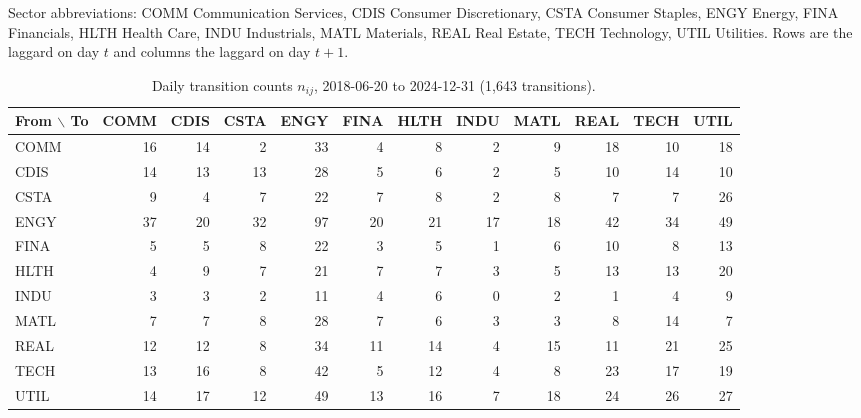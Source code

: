 \documentclass[11pt]{article}
\begin{document}
Sector abbreviations: COMM Communication Services, CDIS Consumer Discretionary, CSTA Consumer Staples, ENGY Energy, FINA Financials, HLTH Health Care, INDU Industrials, MATL Materials, REAL Real Estate, TECH Technology, UTIL Utilities. Rows are the laggard on day $t$ and columns the laggard on day $t+1$.

\begin{table}[htbp]\centering
\caption{Daily transition counts $n_{ij}$, 2018-06-20 to 2024-12-31 (1{,}643 transitions).}
\label{tab:counts}
\small
\setlength{\tabcolsep}{4pt}
\begin{tabular}{lrrrrrrrrrrr}
\toprule
From $\backslash$ To & COMM & CDIS & CSTA & ENGY & FINA & HLTH & INDU & MATL & REAL & TECH & UTIL \\
\midrule
COMM & 16 & 14 & 2 & 33 & 4 & 8 & 2 & 9 & 18 & 10 & 18 \\
CDIS & 14 & 13 & 13 & 28 & 5 & 6 & 2 & 5 & 10 & 14 & 10 \\
CSTA & 9 & 4 & 7 & 22 & 7 & 8 & 2 & 8 & 7 & 7 & 26 \\
ENGY & 37 & 20 & 32 & 97 & 20 & 21 & 17 & 18 & 42 & 34 & 49 \\
FINA & 5 & 5 & 8 & 22 & 3 & 5 & 1 & 6 & 10 & 8 & 13 \\
HLTH & 4 & 9 & 7 & 21 & 7 & 7 & 3 & 5 & 13 & 13 & 20 \\
INDU & 3 & 3 & 2 & 11 & 4 & 6 & 0 & 2 & 1 & 4 & 9 \\
MATL & 7 & 7 & 8 & 28 & 7 & 6 & 3 & 3 & 8 & 14 & 7 \\
REAL & 12 & 12 & 8 & 34 & 11 & 14 & 4 & 15 & 11 & 21 & 25 \\
TECH & 13 & 16 & 8 & 42 & 5 & 12 & 4 & 8 & 23 & 17 & 19 \\
UTIL & 14 & 17 & 12 & 49 & 13 & 16 & 7 & 18 & 24 & 26 & 27 \\
\bottomrule
\end{tabular}
\end{table}
\end{document}
